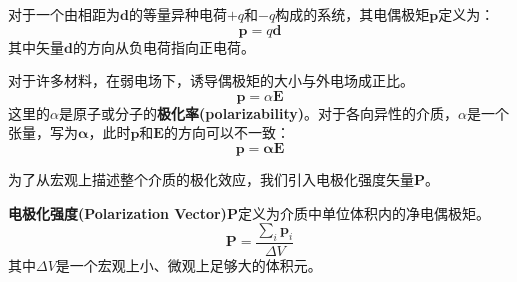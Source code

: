 \documentclass[fontset=none]{ctexart}
\begin{document}
\begin{definition}[电偶极矩]
    对于一个由相距为$\bm{d}$的等量异种电荷$+q$和$-q$构成的系统，其电偶极矩$\bm{p}$定义为：
    \begin{equation}
        \bm{p} = q\bm{d}
    \end{equation}
    其中矢量$\bm{d}$的方向从负电荷指向正电荷。
\end{definition}

对于许多材料，在弱电场下，诱导偶极矩的大小与外电场成正比。
\begin{equation}
    \bm{p} = \alpha \bm{E}
\end{equation}
这里的$\alpha$是原子或分子的\textbf{极化率(polarizability)}。对于各向异性的介质，$\alpha$是一个张量，写为$\bm{\alpha}$，此时$\bm{p}$和$\bm{E}$的方向可以不一致：
\begin{equation}
    \bm{p} = \bm{\alpha} \bm{E}
\end{equation}

为了从宏观上描述整个介质的极化效应，我们引入电极化强度矢量$\bm{P}$。
\begin{definition}[电极化强度矢量]
    \textbf{电极化强度(Polarization Vector)}$\bm{P}$定义为介质中单位体积内的净电偶极矩。
    \begin{equation}
        \bm{P} = \frac{\sum_{i} \bm{p}_i}{\Delta V}
    \end{equation}
    其中$\Delta V$是一个宏观上小、微观上足够大的体积元。
\end{definition}
\end{document}
